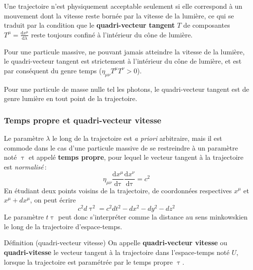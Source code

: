    Une trajectoire n’est physiquement acceptable seulement si elle correspond à un mouvement dont la vitesse reste bornée par la vitesse de la lumière, ce qui se traduit par la condition que le \textbf{quadri-vecteur tangent} $T$ de composantes $T^{\mu} = \frac{\text{d}x^{\mu}}{\text{d}\lambda}$ reste toujours confiné à l’intérieur du cône de lumière.  
    
    Pour une particule massive, ne pouvant jamais atteindre la vitesse de la lumière, le quadri-vecteur tangent est strictement à l’intérieur du cône de lumière, et est par conséquent du genre temps ($\eta_{\mu\nu} T^{\mu} T^{\nu} > 0$). 

    Pour une particule de masse nulle tel les photons, le quadri-vecteur tangent est de genre lumière en tout point de la trajectoire.

        \subsubsection{Temps propre et quadri-vecteur vitesse}


        Le paramètre $\lambda$ le long de la trajectoire est \textit{a priori} arbitraire, mais il est commode dans le cas d’une particule massive de se restreindre à un paramètre noté $\uptau$ et appelé \textbf{temps propre}, pour lequel le vecteur tangent à la trajectoire est \textit{normalisé} :
        \[ \eta_{\mu\nu} \frac{\text{d}x^{\mu}}{\text{d}\uptau} \frac{\text{d}x^{\nu}}{\text{d}\uptau} = c^2 \]
        En étudiant deux points voisins de la trajectoire, de coordonnées respectives $x^{\mu}$ et $x^{\mu} + dx^{\mu}$, on peut écrire 
        \[ c^2 d\uptau^2 = c^2 dt^2 - dx^2 - dy^2 - dz^2 \]   
        Le paramètre $t\uptau$ peut donc s’interpréter comme la distance au sens minkowskien le long de la trajectoire d’espace-temps.

        \begin{omed}{Définition (quadri-vecteur vitesse)}
            On appelle \textbf{quadri-vecteur vitesse} ou \textbf{quadri-vitesse} le vecteur tangent à la trajectoire dans l’espace-temps noté $U$, lorsque la trajectoire est paramétrée par le temps propre $\uptau$.
        \end{omed}

